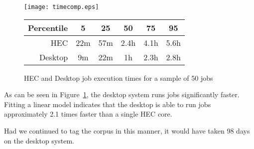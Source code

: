 \begin{figure}[h]
    \centering
    \texttt{[image: timecomp.eps]}


    \begin{tabular}{ | r | c | c | c | c | c | }
        \hline
        Percentile & 5 & 25 & 50 & 75 & 95 \\ \hline
        HEC        & 22m & 57m & 2.4h & 4.1h & 5.6h \\ \hline
        Desktop    & 9m & 22m & 1h & 2.3h & 2.8h \\ \hline
    \end{tabular}

    \caption{HEC and Desktop job execution times for a sample of 50 jobs}
    \label{fig:timecomp}
\end{figure}


As can be seen in Figure~\ref{fig:timecomp}, the desktop system runs jobs significantly faster.  Fitting a linear model indicates that the desktop is able to run jobs approximately 2.1 times faster than a single HEC core.  

Had we continued to tag the corpus in this manner, it would have taken 98 days on the desktop system.
